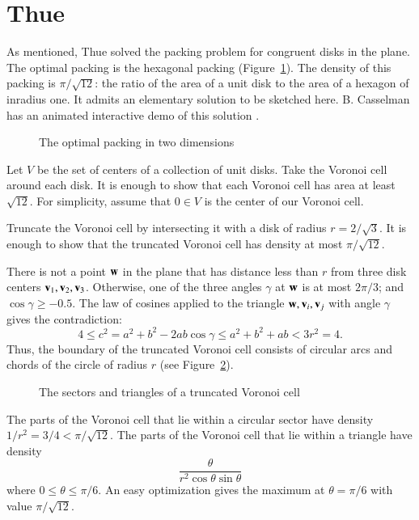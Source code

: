 \section{Thue}\label{sec:thue}


As mentioned, Thue solved the packing problem for congruent disks in
the plane.  The optimal packing is the hexagonal packing
(Figure~\ref{fig:2D-hex}).  The density of this packing is
$\pi/\sqrt{12}$: the ratio of the area of a unit disk to the area of a
hexagon of inradius one.  It admits an elementary solution to be
sketched here.  B. Casselman has an animated interactive demo of this
solution \cite{casselman:pennies}.

\begin{figure}[htb]
  \centering
  \caption{The optimal packing in two dimensions}
  \label{fig:2D-hex}
\end{figure}

Let $V$ be the set of centers of a collection of unit disks.  Take the
Voronoi cell around each disk.  It is enough to show that each Voronoi
cell has area at least $\sqrt{12}$.  For simplicity, assume that $0\in
V$ is the center of our Voronoi cell.

Truncate the Voronoi cell by intersecting it with a disk of radius
$r=2/\sqrt3$.  It is enough to show that the truncated Voronoi cell
has density at most $\pi/\sqrt{12}$.

There is not a point ${\mathbf w}$ in the plane that has distance less than $r$
from three disk centers ${\mathbf v}_1,{\mathbf v}_2,{\mathbf v}_3$.  Otherwise, one of the three
angles $\gamma$ at ${\mathbf w}$ is at most $2\pi/3$; and $\cos\gamma\ge -0.5$.
The law of cosines applied to the triangle ${\mathbf w},{\mathbf v}_i,{\mathbf v}_j$ with angle
$\gamma$ gives the contradiction:
   \begin{displaymath}
   4 \le c^2 = a^2 + b^2 - 2 a b \cos\gamma 
   \le a^2 + b^2 + a b < 3r^2 = 4.
   \end{displaymath}
Thus, the boundary of the truncated Voronoi cell consists of circular
arcs and chords of the circle of radius $r$ (see Figure~\ref{fig:2D-proof}).

\begin{figure}[htb]
  \centering
  \caption{The sectors and triangles of a truncated Voronoi cell}
  \label{fig:2D-proof}
\end{figure}

The parts of the Voronoi cell that lie within a circular sector have
density $1/r^2 = 3/4 < \pi/\sqrt{12}$.  The parts of the Voronoi cell
that lie within a triangle have density
   \begin{equation}\label{eqn:rog2d}
   \frac{\theta}{r^2 \cos\theta\sin\theta}
   \end{equation}
where $0 \le \theta\le \pi/6$.  An easy optimization gives the maximum
at $\theta=\pi/6$ with value $\pi/\sqrt{12}$.

